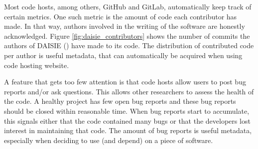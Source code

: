 Most code hosts, among others, GitHub and GitLab,
automatically keep track of certain metrics.
One such metric is the amount of code each contributor has made.
In that way, authors involved in the writing of the software
are honestly acknowledged. Figure \ref{fig:daisie_contributors}
shows the number of commits the authors of DAISIE (\cite{etienne2020daisie})
have made to its code.
The distribution of contributed code per author 
is useful metadata, that can automatically
be acquired when using code hosting website.

A feature that gets too few attention is that code hosts
allow users to post bug reports and/or ask questions.
This allows other researchers to assess the health
of the code.
A healthy project has few open bug reports
and these bug reports should be closed within reasonable time.
When bug reports start to accumulate, this
signals either that the code contained many bugs or that
the developers lost interest in maintaining that code.
The amount of bug reports is useful metadata, 
especially when deciding to use (and depend) on a piece of software.

